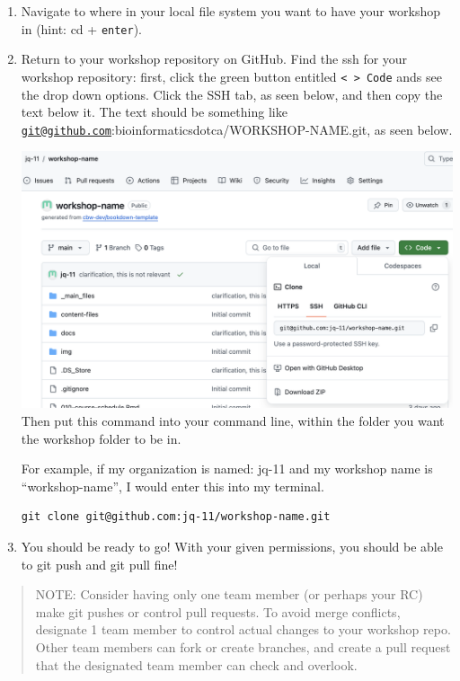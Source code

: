 \documentclass[
]{book}
\theoremstyle{definition}
\theoremstyle{definition}
\theoremstyle{definition}
\theoremstyle{definition}
\theoremstyle{remark}
\begin{document}
\begin{enumerate}
\def\labelenumi{\arabic{enumi}.}
\item
  Navigate to where in your local file system you want to have your workshop in (hint: cd + \texttt{enter}).
\item
  Return to your workshop repository on GitHub. Find the ssh for your workshop repository: first, click the green button entitled \texttt{\textless{}\ \textgreater{}\ Code} ands see the drop down options. Click the SSH tab, as seen below, and then copy the text below it. The text should be something like \href{mailto:git@github.com}{\nolinkurl{git@github.com}}:bioinformaticsdotca/WORKSHOP-NAME.git, as seen below.

  \includegraphics{img/git-instruct/copy-ssh.png}\\

  Then put this command into your command line, within the folder you want the workshop folder to be in.

  For example, if my organization is named: jq-11 and my workshop name is ``workshop-name'', I would enter this into my terminal.

\begin{verbatim}
git clone git@github.com:jq-11/workshop-name.git
\end{verbatim}
\item
  You should be ready to go! With your given permissions, you should be able to git push and git pull fine!
\end{enumerate}

\begin{quote}
NOTE: Consider having only one team member (or perhaps your RC) make git pushes or control pull requests. To avoid merge conflicts, designate 1 team member to control actual changes to your workshop repo. Other team members can fork or create branches, and create a pull request that the designated team member can check and overlook.
\end{quote}
\end{document}
